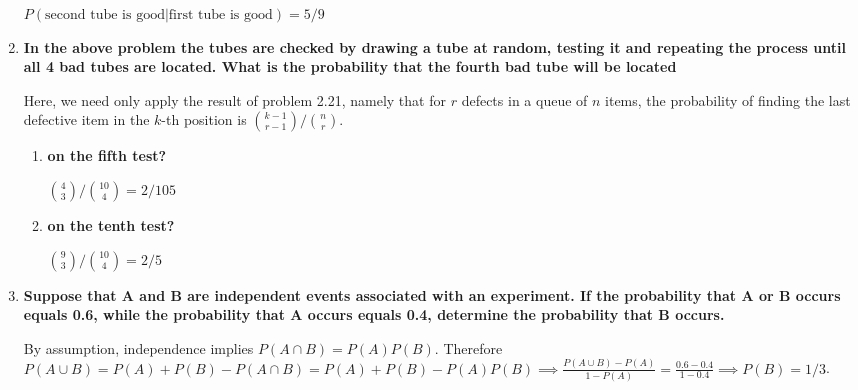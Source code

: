 \documentclass[10pt, oneside]{article}   	%
\theoremstyle{definition}
\begin{document}
\begin{enumerate}[label=3.\arabic*]
$P(\text{second tube is good} | \text{first tube is good}) = \boxed{5/9}$

\item  \begin{tcolorbox}[
  colback=Cerulean!5!white,
  colframe=Cerulean!75!black]
\textbf{In the above problem the tubes are checked by drawing a tube at random, testing it and repeating the process until all 4 bad tubes are located. What is the probability that the fourth bad tube will be located}
\end{tcolorbox}

Here, we need only apply the result of problem 2.21, namely that for $r$ defects in a queue of $n$ items, the probability of finding the last defective item in the $k$-th position is $\binom{k-1}{r-1} / \binom{n}{r}$.

	\begin{enumerate}
	\item  \begin{tcolorbox}[
	  colback=Cerulean!5!white,
	  colframe=Cerulean!75!black]
	\textbf{on the fifth test?}
	\end{tcolorbox}
	
	$\binom{4}{3} / \binom{10}{4} = \boxed{2/105}$
	
	\item  \begin{tcolorbox}[
	  colback=Cerulean!5!white,
	  colframe=Cerulean!75!black]
	\textbf{on the tenth test?}
	\end{tcolorbox}
	
	$\binom{9}{3} / \binom{10}{4} = \boxed{2/5}$
	
	\end{enumerate}

\item  \begin{tcolorbox}[
  colback=Cerulean!5!white,
  colframe=Cerulean!75!black]
\textbf{Suppose that $\bm{A}$ and $\bm{B}$ are independent events associated with an experiment. If the probability that $\bm{A}$ or $\bm{B}$ occurs equals 0.6, while the probability that $\bm{A}$ occurs equals 0.4, determine the probability that $\bm{B}$ occurs.}
\end{tcolorbox}

By assumption, independence implies $P(A \cap B) = P(A)P(B)$. Therefore $P(A \cup B) = P(A) + P(B) - P(A \cap B) = P(A) + P(B) - P(A)P(B) \implies \frac{P(A \cup B) - P(A)}{1 - P(A)} = \frac{0.6 - 0.4}{1 - 0.4} \implies \boxed{P(B) = 1/3}$.


\end{enumerate}
\end{document}
